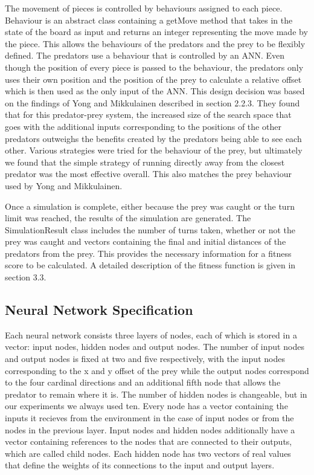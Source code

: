 \documentclass[12pt]{article} %
\begin{document}
The movement of pieces is controlled by behaviours assigned to each piece. Behaviour is an abstract class containing a getMove method that takes in the state of the board as input and returns an integer representing the move made by the piece. This allows the behaviours of the predators and the prey to be flexibly defined. The predators use a behaviour that is controlled by an ANN. Even though the position of every piece is passed to the behaviour, the predators only uses their own position and the position of the prey to calculate a relative offset which is then used as the only input of the ANN. This design decision was based on the findings of Yong and Mikkulainen \cite{Yong2001} described in section 2.2.3. They found that for this predator-prey system, the increased size of the search space that goes with the additional inputs corresponding to the positions of the other predators outweighs the benefits created by the predators being able to see each other. Various strategies were tried for the behaviour of the prey, but ultimately we found that the simple strategy of running directly away from the closest predator was the most effective overall. This also matches the prey behaviour used by Yong and Mikkulainen.

Once a simulation is complete, either because the prey was caught or the turn limit was reached, the results of the simulation are generated. The SimulationResult class includes the number of turns taken, whether or not the prey was caught and vectors containing the final and initial distances of the predators from the prey. This provides the necessary information for a fitness score to be calculated. A detailed description of the fitness function is given in section 3.3.

\subsection{Neural Network Specification}

Each neural network consists three layers of nodes, each of which is stored in a vector: input nodes, hidden nodes and output nodes. The number of input nodes and output nodes is fixed at two and five respectively, with the input nodes corresponding to the x and y offset of the prey while the output nodes correspond to the four cardinal directions and an additional fifth node that allows the predator to remain where it is. The number of hidden nodes is changeable, but in our experiments we always used ten. Every node has a vector containing the inputs it recieves from the environment in the case of input nodes or from the nodes in the previous layer. Input nodes and hidden nodes additionally have a vector containing references to the nodes that are connected to their outputs, which are called child nodes. Each hidden node has two vectors of real values that define the weights of its connections to the input and output layers.
\end{document}
